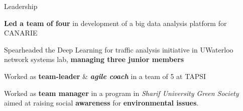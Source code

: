 

\begin{xSection}{Leadership}

    \medskip
    \small
    \begin{myitemize}

        \item \textbf{Led a team of four} in development of a big data analysis platform for CANARIE
        \item Spearheaded the Deep Learning for traffic analysis initiative in UWaterloo network systems lab, \textbf{managing three junior members}
        \item Worked as \textbf{team-leader} \& \textit{\textbf{agile coach}} in a team of 5 at TAPSI
        \item Worked as \textbf{team manager} in a program in \textit{Sharif University Green Society} aimed at raising social \textbf{awareness} for \textbf{environmental issues}.

    \end{myitemize}

\end{xSection}	

